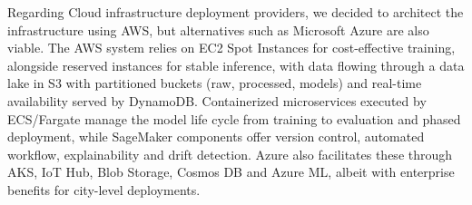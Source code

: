 Regarding Cloud infrastructure deployment providers, we decided to architect the infrastructure using AWS, but alternatives such as Microsoft Azure are also viable. The AWS system relies on EC2 Spot Instances for cost-effective training, alongside reserved instances for stable inference, with data flowing through a data lake in S3 with partitioned buckets (raw, processed, models) and real-time availability served by DynamoDB. Containerized microservices executed by ECS/Fargate manage the model life cycle from training to evaluation and phased deployment, while SageMaker components offer version control, automated workflow, explainability and drift detection. Azure also facilitates these through AKS, IoT Hub, Blob Storage, Cosmos DB and Azure ML, albeit with enterprise benefits for city-level deployments.